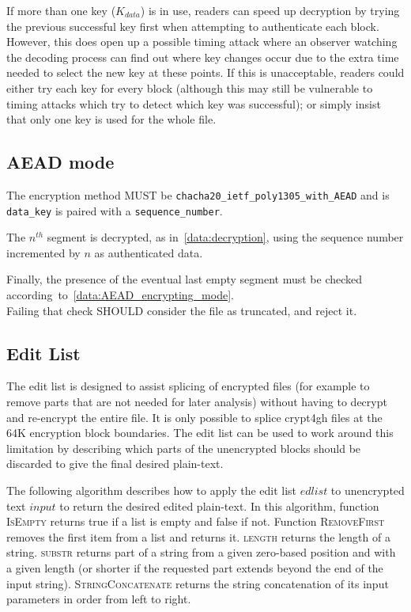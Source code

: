 \documentclass[10pt]{article}
\newcommand{\kw}[1]{\texttt{#1}}
\begin{document}
If more than one key ($K_{data}$) is in use,
readers can speed up decryption by trying the previous successful key first when attempting to authenticate each block.
However, this does open up a possible timing attack where an observer watching the decoding process can find
out where key changes occur due to the extra time needed to select the new key at these points.
If this is unacceptable, readers could either try each key for every block (although this may still be vulnerable
to timing attacks which try to detect which key was successful); or simply insist that only one key is used for
the whole file.

\subsection{AEAD mode}\label{data:AEAD_decrypting_mode}

The encryption method MUST be \kw{chacha20\_ietf\_poly1305\_with\_AEAD} and is \kw{data\_key} is paired with a \kw{sequence\_number}.

The $n^{th}$ segment is decrypted, as in~\ref{data:decryption}, using the sequence number incremented by $n$ as authenticated data.

Finally, the presence of the eventual last empty segment must be checked according~to~\ref{data:AEAD_encrypting_mode}.\\
Failing that check SHOULD consider the file as truncated, and reject it.

\subsection{Edit List}\label{data:edit_list}

The edit list is designed to assist splicing of encrypted files (for example to remove parts that are not needed
for later analysis) without having to decrypt and re-encrypt the entire file.
It is only possible to splice crypt4gh files at the 64K encryption block boundaries.
The edit list can be used to work around this limitation by describing which parts of the unencrypted blocks
should be discarded to give the final desired plain-text.

The following algorithm describes how to apply the edit list $edlist$ to unencrypted text $input$ to return
the desired edited plain-text.
In this algorithm, function \textsc{IsEmpty} returns true if a list is empty and false if not.
Function \textsc{RemoveFirst} removes the first item from a list and returns it.
\textsc{length} returns the length of a string.
\textsc{substr} returns part of a string from a given zero-based position and with a given length (or shorter if the
requested part extends beyond the end of the input string).
\textsc{StringConcatenate} returns the string concatenation of its input parameters in order from left to right.
\end{document}
